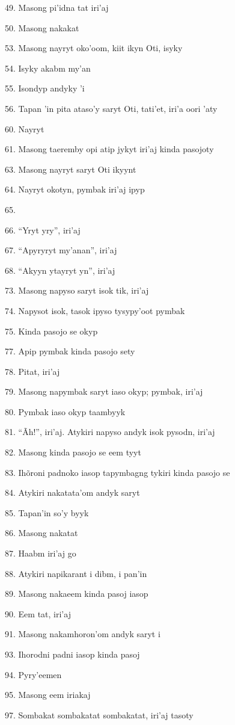 49. Masong pi'idna tat iri'aj

50. Masong nakakat

53. Masong nayryt oko'oom, kiit ikyn Oti, isyky

54. Isyky akabm my'an

55. Isondyp andyky 'i

56. Tapan 'in pita ataso'y saryt Oti, tati'et, iri'a oori 'aty

60. Nayryt

61. Masong taeremby opi atip jykyt iri'aj kinda pasojoty

63. Masong nayryt saryt Oti ikyynt

64. Nayryt okotyn, pymbak iri'aj ipyp

65. 

66. ``Yryt yry'', iri'aj

67. ``Apyryryt my'anan'', iri'aj

68. ``Akyyn ytayryt yn'', iri'aj

73. Masong napyso saryt isok tik, iri'aj

74. Napysot isok, tasok ipyso tysypy'oot pymbak

75. Kinda pasojo se okyp

77. Apip pymbak kinda pasojo sety

78. Pitat, iri'aj

79. Masong napymbak saryt iaso okyp; pymbak, iri'aj

80. Pymbak iaso okyp taambyyk

81. ``Ãh!'', iri'aj. Atykiri napyso andyk isok pysodn, iri'aj

82. Masong kinda pasojo se eem tyyt

83. Ihõroni padnoko iasop tapymbagng tykiri kinda pasojo se

84. Atykiri nakatata'om andyk saryt

85. Tapan'in so'y byyk

86. Masong nakatat

87. Haabm iri'aj go

88. Atykiri napikarant i dibm, i pan'in

89. Masong nakaeem kinda pasoj iasop

90. Eem tat, iri'aj

91. Masong nakamhoron'om andyk saryt i

93. Ihorodni padni iasop kinda pasoj

94. Pyry'eemen

95. Masong eem iriakaj

97. Sombakat sombakatat sombakatat, iri'aj tasoty

